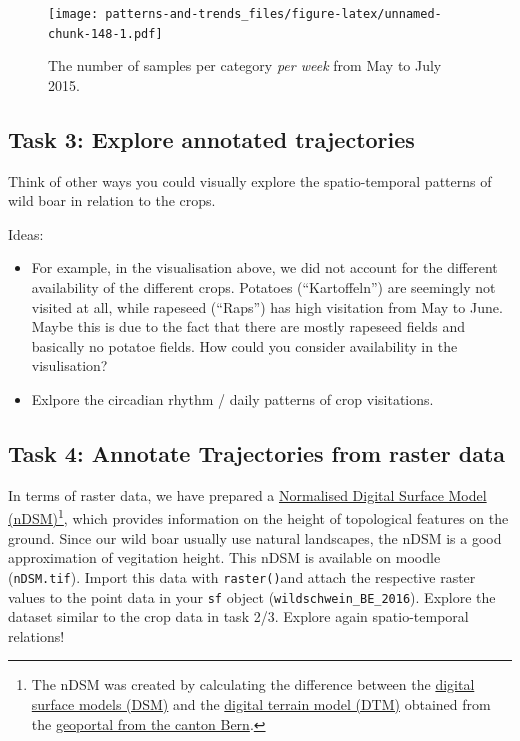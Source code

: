 \documentclass[]{book}
\providecommand{\tightlist}{%
  \setlength{\itemsep}{0pt}\setlength{\parskip}{0pt}}
\let\rmarkdownfootnote\footnote%
\def\footnote{\protect\rmarkdownfootnote}
\begin{document}
\begin{figure}
\centering
\texttt{[image: patterns-and-trends\_files/figure-latex/unnamed-chunk-148-1.pdf]}
\caption{\label{fig:unnamed-chunk-148}The number of samples per category \emph{per week} from May to July 2015.}
\end{figure}

\hypertarget{task-3-explore-annotated-trajectories}{%
\subsection{Task 3: Explore annotated trajectories}\label{task-3-explore-annotated-trajectories}}

Think of other ways you could visually explore the spatio-temporal patterns of wild boar in relation to the crops.

Ideas:

\begin{itemize}
\tightlist
\item
  For example, in the visualisation above, we did not account for the different availability of the different crops. Potatoes (``Kartoffeln'') are seemingly not visited at all, while rapeseed (``Raps'') has high visitation from May to June. Maybe this is due to the fact that there are mostly rapeseed fields and basically no potatoe fields. How could you consider availability in the visulisation?
\item
  Exlpore the circadian rhythm / daily patterns of crop visitations.
\end{itemize}

\hypertarget{task-4-annotate-trajectories-from-raster-data}{%
\subsection{Task 4: Annotate Trajectories from raster data}\label{task-4-annotate-trajectories-from-raster-data}}

In terms of raster data, we have prepared a \href{https://gisgeography.com/lidar-light-detection-and-ranging/}{Normalised Digital Surface Model (nDSM)}\footnote{The nDSM was created by calculating the difference between the \href{https://www.geo.apps.be.ch/de/geodaten/suche-nach-geodaten.html?view=sheet\&guid=094ce943-6ad7-4f07-aa9f-d8eb17c5cb38\&catalog=geocatalog\&type=complete\&preview=search_list}{digital surface models (DSM)} and the \href{https://www.geo.apps.be.ch/de/geodaten/suche-nach-geodaten.html?view=sheet\&guid=490de97b-8932-4ef7-9d13-e89ef41eeb4b\&catalog=geocatalog\&type=complete\&preview=search_list}{digital terrain model (DTM)} obtained from the \href{https://www.geo.apps.be.ch/de/geodaten/suche-nach-geodaten.html}{geoportal from the canton Bern}. }, which provides information on the height of topological features on the ground. Since our wild boar usually use natural landscapes, the nDSM is a good approximation of vegitation height. This nDSM is available on moodle (\texttt{nDSM.tif}). Import this data with \texttt{raster()}and attach the respective raster values to the point data in your \texttt{sf} object (\texttt{wildschwein\_BE\_2016}). Explore the dataset similar to the crop data in task 2/3. Explore again spatio-temporal relations!
\end{document}
